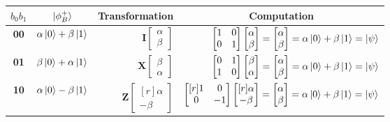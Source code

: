 \documentclass[11pt, oneside]{article}   	%
\begin{document}
\bigskip
\begin{table}[H]
\centering
\begin{tabular}{c | c | r | r}
$b_{0} b_{1}$  & $\ket{\phi^{+}_B}$  & \multicolumn{1}{c|}{Transformation} & \multicolumn{1}{c}{Computation}  \\
\hline
\textbf{00}  & $\alpha \ket{0} + \beta \ket{1}$ & $\mathbf{I} \begin{bmatrix} \alpha \\ \beta \end{bmatrix}$ & $\begin{bmatrix} 1 & 0 \\ 0 & 1 \end{bmatrix} 
 \begin{bmatrix} \alpha \\ \beta \end{bmatrix}  = \begin{bmatrix} \alpha \\  \beta  \end{bmatrix} = \alpha \ket{0} + \beta \ket{1} = \ket{\psi}$  \\
\textbf{01}  & $\beta \ket{0} + \alpha \ket{1}$ & $\mathbf{X}\begin{bmatrix} \beta \\ \alpha  \end{bmatrix}$ & $ \begin{bmatrix} 0 & 1 \\ 1 & 0 \end{bmatrix}  \begin{bmatrix} \beta \\ \alpha  \end{bmatrix} 
= \begin{bmatrix} \alpha \\  \beta  \end{bmatrix}  = \alpha \ket{0} + \beta \ket{1} = \ket{\psi}$ \\
\textbf{10}  & $\alpha \ket{0} - \beta \ket{1}$ & $\mathbf{Z} \begin{bmatrix}[r]   \alpha \\  -\beta  \end{bmatrix}$ & $\begin{bmatrix}[r] 1 & 0  \\ 0 & -1 \end{bmatrix}  \begin{bmatrix}[r] \alpha \\ -\beta \end{bmatrix} 
= \begin{bmatrix} \alpha \\  \beta  \end{bmatrix}  = \alpha \ket{0} + \beta \ket{1} = \ket{\psi}$ \\

\end{tabular}
\end{table}
\end{document}
